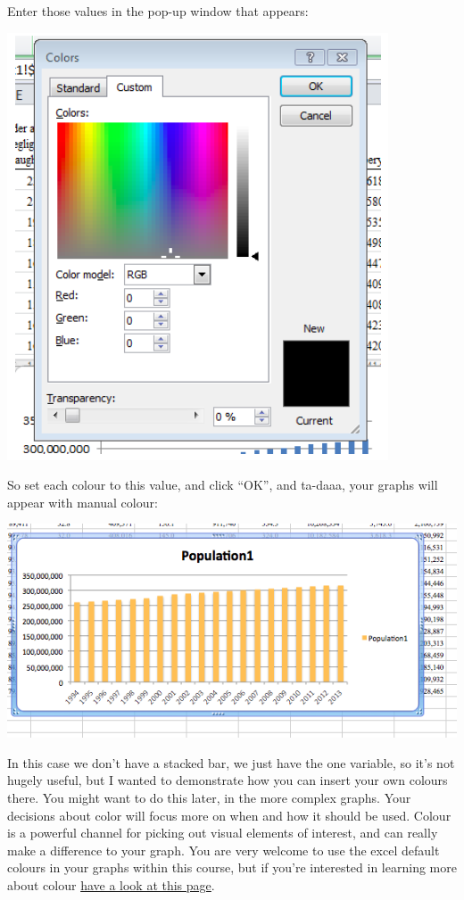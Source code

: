 \documentclass[
]{book}
\begin{document}
Enter those values in the pop-up window that appears:

\includegraphics{imgs/pc_rbg.png}

So set each colour to this value, and click ``OK'', and ta-daaa, your graphs will appear with manual colour:

\includegraphics{imgs/manual_fill_6.png}

In this case we don't have a stacked bar, we just have the one variable, so it's not hugely useful, but I wanted to demonstrate how you can insert your own colours there. You might want to do this later, in the more complex graphs. Your decisions about color will focus more on when and how it should be used. Colour is a powerful channel for picking out visual elements of interest, and can really make a difference to your graph. You are very welcome to use the excel default colours in your graphs within this course, but if you're interested in learning more about colour \href{https://lisacharlotterost.github.io/2016/04/22/Colors-for-DataVis/}{have a look at this page}.
\end{document}
